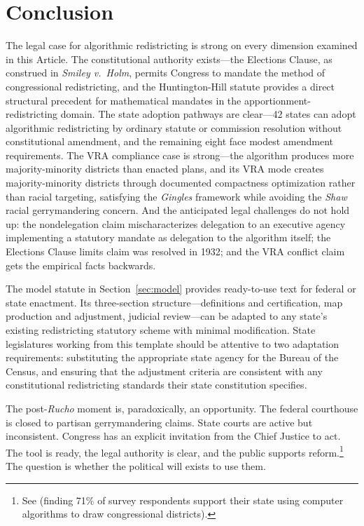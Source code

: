 \section{Conclusion}
\label{sec:conclusion}

The legal case for algorithmic redistricting is strong on every dimension examined in this Article. The constitutional authority exists---the Elections Clause, as construed in \textit{Smiley v.\ Holm}, permits Congress to mandate the method of congressional redistricting, and the Huntington-Hill statute provides a direct structural precedent for mathematical mandates in the apportionment-redistricting domain. The state adoption pathways are clear---42 states can adopt algorithmic redistricting by ordinary statute or commission resolution without constitutional amendment, and the remaining eight face modest amendment requirements. The VRA compliance case is strong---the algorithm produces more majority-minority districts than enacted plans, and its VRA mode creates majority-minority districts through documented compactness optimization rather than racial targeting, satisfying the \textit{Gingles} framework while avoiding the \textit{Shaw} racial gerrymandering concern. And the anticipated legal challenges do not hold up: the nondelegation claim mischaracterizes delegation to an executive agency implementing a statutory mandate as delegation to the algorithm itself; the Elections Clause limits claim was resolved in 1932; and the VRA conflict claim gets the empirical facts backwards.

The model statute in Section~\ref{sec:model} provides ready-to-use text for federal or state enactment. Its three-section structure---definitions and certification, map production and adjustment, judicial review---can be adapted to any state's existing redistricting statutory scheme with minimal modification. State legislatures working from this template should be attentive to two adaptation requirements: substituting the appropriate state agency for the Bureau of the Census, and ensuring that the adjustment criteria are consistent with any constitutional redistricting standards their state constitution specifies.

The post-\textit{Rucho} moment is, paradoxically, an opportunity. The federal courthouse is closed to partisan gerrymandering claims. State courts are active but inconsistent. Congress has an explicit invitation from the Chief Justice to act. The tool is ready, the legal authority is clear, and the public supports reform.\footnote{See \citet{dellaLibera2026survey} (finding 71\% of survey respondents support their state using computer algorithms to draw congressional districts).} The question is whether the political will exists to use them.

